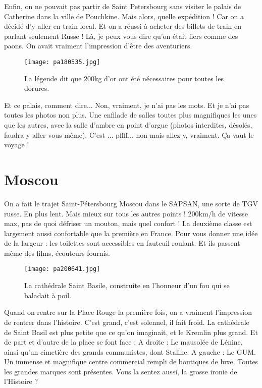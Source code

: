 \documentclass{book}
\begin{document}
Enfin, on ne pouvait pas partir de Saint Petersbourg sans visiter le palais de Catherine dans la ville de Pouchkine. Mais alors, quelle expédition ! Car on a décidé d'y aller en train local. Et on a réussi à acheter des billets de train en parlant seulement Russe ! Là, je peux vous dire qu'on était fiers comme des paons. On avait vraiment l'impression d'être des aventuriers.


\begin{wrapfigure}{l}{0.55\textwidth}
\centering
\texttt{[image: pa180535.jpg]}
\caption*{ La légende dit que 200kg d'or ont été nécessaires pour toutes les dorures.}
\end{wrapfigure}

Et ce palais, comment dire... Non, vraiment, je n'ai pas les mots. Et je n'ai pas toutes les photos non plus. Une enfilade de salles toutes plus magnifiques les unes que les autres, avec la salle d'ambre en point d'orgue (photos interdites, désolés, faudra y aller vous même).
C'est ... pffff... non mais allez-y, vraiment. Ça vaut le voyage !



\chapter{Moscou}
On a fait le trajet Saint-Pétersbourg Moscou dans le SAPSAN, une sorte de TGV russe. En plus lent. Mais mieux sur tous les autres points ! 200km/h de vitesse max, pas de quoi défriser un mouton, mais quel confort ! La deuxième classe est largement aussi confortable que la première en France. Pour vous donner une idée de la largeur : les toilettes sont accessibles en fauteuil roulant. Et ils passent même des films, écouteurs fournis.


\begin{wrapfigure}{l}{0.55\textwidth}
\centering
\texttt{[image: pa200641.jpg]}
\caption*{ La cathédrale Saint Basile, construite en l'honneur d'un fou qui se baladait à poil.}
\end{wrapfigure}

Quand on rentre sur la Place Rouge la première fois, on a vraiment l'impression de rentrer dans l'histoire. C'est grand, c'est solennel, il fait froid. La cathédrale de Saint Basil est plus petite que ce qu'on imaginait, et le Kremlin plus grand.
Et de part et d'autre de la place se font face :
A droite : Le mausolée de Lénine, ainsi qu'un cimetière des grands communistes, dont Staline.
A gauche : Le GUM. Un immense et magnifique centre commercial rempli de boutiques de luxe. Toutes les grandes marques sont présentes.
Vous la sentez aussi, la grosse ironie de l'Histoire ?
\end{document}
